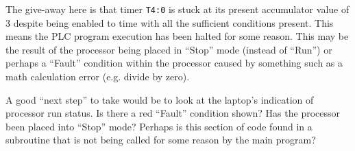 
The give-away here is that timer {\tt T4:0} is stuck at its present accumulator value of 3 despite being enabled to time with all the sufficient conditions present.  This means the PLC program execution has been halted for some reason.  This may be the result of the processor being placed in ``Stop'' mode (instead of ``Run'') or perhaps a ``Fault'' condition within the processor caused by something such as a math calculation error (e.g. divide by zero).
 
\vskip 10pt

A good ``next step'' to take would be to look at the laptop's indication of processor run status.  Is there a red ``Fault'' condition shown?  Has the processor been placed into ``Stop'' mode?  Perhaps is this section of code found in a subroutine that is not being called for some reason by the main program?











